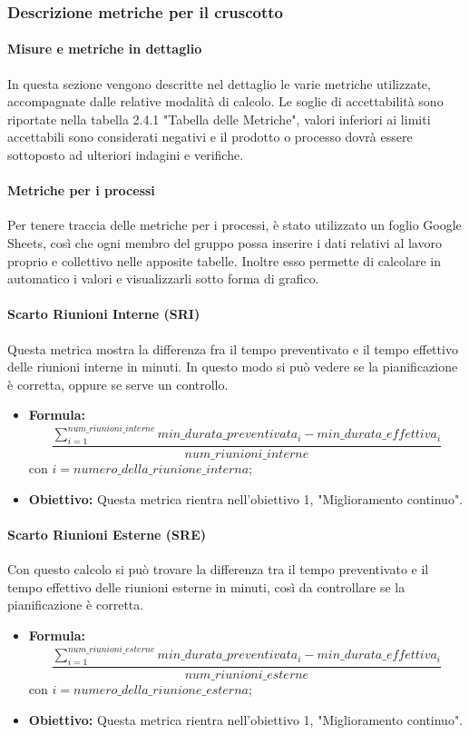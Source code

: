 	\subsubsection{Descrizione metriche per il cruscotto}
	\paragraph{Misure e metriche in dettaglio}
	In questa sezione vengono descritte nel dettaglio le varie metriche utilizzate, accompagnate dalle relative modalità di calcolo.
	Le soglie di accettabilità sono riportate nella tabella 2.4.1 "Tabella delle Metriche", valori inferiori ai limiti accettabili sono considerati negativi e il prodotto o processo dovrà essere sottoposto ad ulteriori indagini e verifiche.
	\paragraph{Metriche per i processi}
	Per tenere traccia delle metriche per i processi, è stato utilizzato un foglio Google Sheets, così che ogni membro del gruppo possa inserire i dati relativi al lavoro proprio e collettivo nelle apposite tabelle. Inoltre esso permette di calcolare in automatico i valori e visualizzarli sotto forma di grafico.
	
	\paragraph{Scarto Riunioni Interne (SRI)}
	Questa metrica mostra la differenza fra il tempo preventivato e il tempo effettivo delle riunioni interne in minuti. In questo modo si può vedere se la pianificazione è corretta, oppure se serve un controllo.
	\begin{itemize}
		\item {\textbf{Formula: }}
		\[\frac{\sum_{i=1}^{num\_riunioni\_interne}min\_durata\_preventivata_i-min\_durata\_effettiva_i}{num\_riunioni\_interne}\]
		con $i = {numero\_della\_riunione\_interna}$;
		\item {\textbf{Obiettivo: }}Questa metrica rientra nell'obiettivo 1, "Miglioramento continuo".
	\end{itemize}
	
	\paragraph{Scarto Riunioni Esterne (SRE)}
	Con questo calcolo si può trovare la differenza tra il tempo preventivato e il tempo effettivo delle riunioni esterne in minuti, così da controllare se la pianificazione è corretta.
	\begin{itemize}
		\item{\textbf{Formula:}}\[\frac{\sum_{i=1}^{num\_riunioni\_esterne}min\_durata\_preventivata_i-min\_durata\_effettiva_i}{num\_riunioni\_esterne}\]
		con $i = {numero\_della\_riunione\_esterna}$;
		\item {\textbf{Obiettivo: }}Questa metrica rientra nell'obiettivo 1, "Miglioramento continuo".
	\end{itemize}
	
